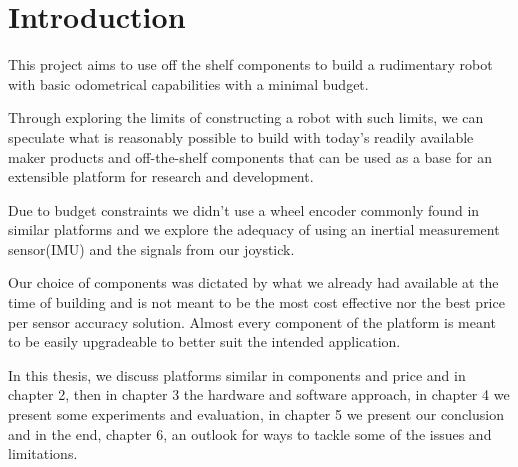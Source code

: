 \documentclass[class=report, crop=false]{standalone}
\begin{document}
\chapter{Introduction}\label{cha:introduction}
\pagestyle{scrheadings}
This project aims to use off the shelf components to build a rudimentary robot with basic odometrical capabilities with a minimal budget.

Through exploring the limits of constructing a robot with such limits, we can speculate what is reasonably possible to build with today's readily available maker products and off-the-shelf components that can be used as a base for an extensible platform for research and development.

Due to budget constraints we didn't use a wheel encoder commonly found in similar platforms and we explore the adequacy of using an inertial measurement sensor(IMU) and the signals from our joystick.

Our choice of components was dictated by what we already had available at the time of building and is not meant to be the most cost effective nor the best price per sensor accuracy solution. Almost every component of the platform is meant to be easily upgradeable to better suit the intended application.

In this thesis, we discuss platforms similar in components and price and in chapter 2, then in chapter 3 the hardware and software approach, in chapter 4 we present some experiments and evaluation, in chapter 5 we present our conclusion and in the end, chapter 6, an outlook for ways to tackle some of the issues and limitations.
\end{document}
